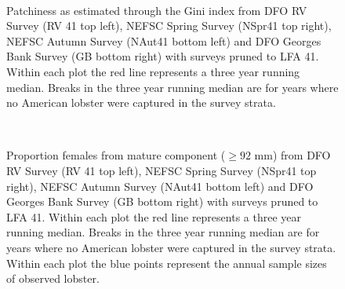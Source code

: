 \documentclass[11pt]{article}
\newcommand{\e}{/backup/bio_data/bio.lobster/figures/} %
\begin{document}
\begin{figure}
\centering
{}
\\

\caption{Patchiness as estimated through the Gini index from DFO RV Survey (RV 41 top left), NEFSC Spring Survey (NSpr41 top right), NEFSC Autumn Survey (NAut41 bottom left) and DFO Georges Bank Survey (GB bottom right) with surveys pruned to LFA 41. Within each plot the red line represents a three year running median. Breaks in the three year running median are for years where no American lobster were captured in the survey strata.}
\end{figure}
\clearpage

\begin{figure}
\centering
{}
\\

\caption{Proportion females from mature component ($ \ge 92$ mm) from DFO RV Survey (RV 41 top left), NEFSC Spring Survey (NSpr41 top right), NEFSC Autumn Survey (NAut41 bottom left) and DFO Georges Bank Survey (GB bottom right) with surveys pruned to LFA 41. Within each plot the red line represents a three year running median. Breaks in the three year running median are for years where no American lobster were captured in the survey strata. Within each plot the blue points represent the annual sample sizes of observed lobster.}
\end{figure}
\clearpage
\end{document}
